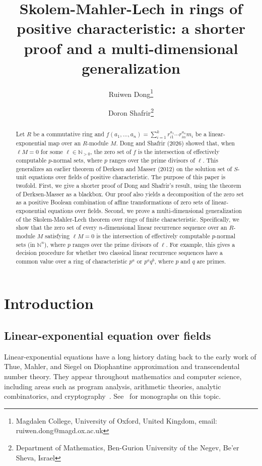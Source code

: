 \documentclass[letterpaper, 11pt, thm-restate]{article}
\numberwithin{equation}{section}
\theoremstyle{definition}
\theoremstyle{definition}
\theoremstyle{definition}
\begin{document}
\title{Skolem-Mahler-Lech in rings of positive characteristic: a shorter proof and a multi-dimensional generalization}
\author{Ruiwen Dong\footnote{Magdalen College, University of Oxford, United Kingdom, email: ruiwen.dong@magd.ox.ac.uk} \and Doron Shafrir\footnote{Department of Mathematics, Ben-Gurion University of the Negev, Be’er Sheva, Israel}}
\date{ }

\maketitle
\begin{abstract}
    Let $R$ be a commutative ring and $f(a_1, \ldots, a_n) = \sum_{i=1}^k r_{i1}^{a_1} \cdots r_{in}^{a_n} m_i$ be a linear-exponential map over an $R$-module $M$.
    Dong and Shafrir (2026) showed that, when $\ell M = 0$ for some $\ell \in \mathbb{N}_{>0}$, the zero set of $f$ is the intersection of effectively computable $p$-normal sets, where $p$ ranges over the prime divisors of $\ell$.
    This generalizes an earlier theorem of Derksen and Masser (2012) on the solution set of $S$-unit equations over fields of positive characteristic.
    The purpose of this paper is twofold.
    First, we give a shorter proof of Dong and Shafrir's result, using the theorem of Derksen-Masser as a blackbox.
    Our proof also yields a decomposition of the zero set as a positive Boolean combination of affine transformations of zero sets of linear-exponential equations over fields.
    Second, we prove a multi-dimensional generalization of the Skolem-Mahler-Lech theorem over rings of finite characteristic.
    Specifically, we show that the zero set of every $n$-dimensional linear recurrence sequence over an $R$-module $M$ satisfying $\ell M = 0$ is the intersection of effectively computable $p$-normal sets (in $\mathbb{N}^n$), where $p$ ranges over the prime divisors of $\ell$.
    For example, this gives a decision procedure for whether two classical linear recurrence sequences have a common value over a ring of characteristic $p^a$ or $p^a q^b$, where $p$ and $q$ are primes.
\end{abstract}

\section{Introduction}
\subsection{Linear-exponential equation over fields}
Linear-exponential equations have a long history dating back to the early work of Thue, Mahler, and Siegel on Diophantine approximation and transcendental number theory.
They appear throughout mathematics and computer science, including areas such as program analysis, arithmetic theories, analytic combinatorics, and cryptography~\cite{10.5555/1481045, flajolet2009analytic, lipton2022skolem, hieronymi2022strong, ibrahim2024positivity}.
See~\cite{evertse2015unit, evertse2022effective} for monographs on this topic.
\end{document}
